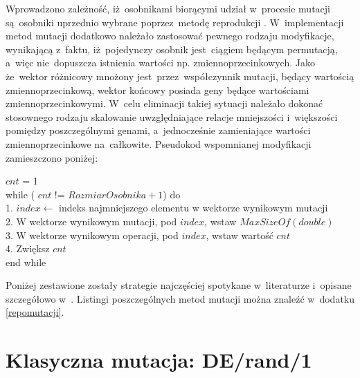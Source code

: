 Wprowadzono zależność, iż~osobnikami biorącymi udział w~procesie mutacji są~osobniki uprzednio wybrane poprzez~metodę reprodukcji \cite{diff2}. W~implementacji metod mutacji dodatkowo należało zastosować pewnego rodzaju modyfikacje, wynikającą z~faktu, iż~pojedynczy osobnik jest~ciągiem będącym permutacją, a~więc nie~dopuszcza istnienia wartości np. zmiennoprzecinkowych. Jako że~wektor różnicowy mnożony jest~przez~współczynnik mutacji, będący wartością zmiennoprzecinkową, wektor końcowy posiada geny będące wartościami zmiennoprzecinkowymi. W~celu eliminacji takiej sytuacji należało dokonać stosownego rodzaju skalowanie uwzględniające relacje mniejszości i~większości pomiędzy poszczególnymi genami, a~jednocześnie zamieniające wartości zmiennoprzecinkowe na~całkowite. Pseudokod wspomnianej modyfikacji zamieszczono poniżej:

\begin{flushleft}
\scriptsize
\hspace{5cm}$cnt$ = 1\\
\hspace{5cm}while ( $cnt$ != $ Rozmiar Osobnika + 1$) do\\
\hspace{5.5cm}	1. $index \leftarrow$ indeks najmniejszego elementu w wektorze wynikowym mutacji\\
\hspace{5.5cm}	2. W wektorze wynikowym mutacji, pod $index$, wstaw $MaxSizeOf(double)$\\
\hspace{5.5cm}	3. W wektorze wynikowym operacji, pod $index$, wstaw wartość $cnt$\\
\hspace{5.5cm}	4. Zwiększ $cnt$\\
\hspace{5cm}end while \\
\end{flushleft}

 Poniżej zestawione zostały strategie najczęściej spotykane w~literaturze i~opisane szczegółowo w~\cite{doktorat}. Listingi poszczególnych metod mutacji można znaleźć w~dodatku \ref{repomutacji}.

\section{Klasyczna mutacja: DE/rand/1}\label{sec:strukturaDokumentu}

